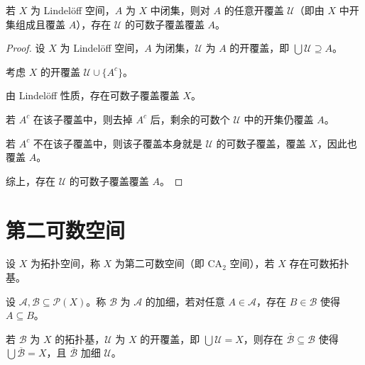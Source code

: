 \documentclass[lang=cn,a4paper,newtx,figureplace=section,tableplace=section]{elegantbook}
\begin{document}
\begin{proposition}\label{prop:lindeloff-characterization}
若 $X$ 为 Lindelöff 空间，$A$ 为 $X$ 中闭集，则对 $A$ 的任意开覆盖 $\mathcal{U}$（即由 $X$ 中开集组成且覆盖 $A$），存在 $\mathcal{U}$ 的可数子覆盖覆盖 $A$。
\end{proposition}
\begin{proof}
设 $X$ 为 Lindelöff 空间，$A$ 为闭集，$\mathcal{U}$ 为 $A$ 的开覆盖，即 $\bigcup \mathcal{U} \supseteq A$。

考虑 $X$ 的开覆盖 $\mathcal{U} \cup \{A^c\}$。

由 Lindelöff 性质，存在可数子覆盖覆盖 $X$。

若 $A^c$ 在该子覆盖中，则去掉 $A^c$ 后，剩余的可数个 $\mathcal{U}$ 中的开集仍覆盖 $A$。

若 $A^c$ 不在该子覆盖中，则该子覆盖本身就是 $\mathcal{U}$ 的可数子覆盖，覆盖 $X$，因此也覆盖 $A$。

综上，存在 $\mathcal{U}$ 的可数子覆盖覆盖 $A$。
\end{proof}

\section{第二可数空间}

\begin{definition}[第二可数空间]\label{def:second-countable}
设 $X$ 为拓扑空间，称 $X$ 为第二可数空间（即 $\text{CA}_2$ 空间），若 $X$ 存在可数拓扑基。
\end{definition}

\begin{definition}[加细]\label{def:refinement}
设 $\mathcal{A}, \mathcal{B} \subseteq \mathcal{P}(X)$。称 $\mathcal{B}$ 为 $\mathcal{A}$ 的加细，若对任意 $A \in \mathcal{A}$，存在 $B \in \mathcal{B}$ 使得 $A \subseteq B$。
\end{definition}

\begin{proposition}\label{prop:base-property}
若 $\mathcal{B}$ 为 $X$ 的拓扑基，$\mathcal{U}$ 为 $X$ 的开覆盖，即 $\bigcup \mathcal{U} = X$，则存在 $\overline{\mathcal{B}} \subseteq \mathcal{B}$ 使得 $\bigcup \overline{\mathcal{B}} = X$，且 $\overline{\mathcal{B}}$ 加细 $\mathcal{U}$。
\end{proposition}
\end{document}
